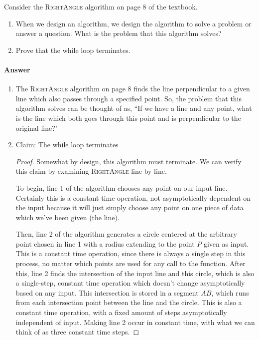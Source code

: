\documentclass{article}
\begin{document}
\nextprob
Consider the \textsc{RightAngle} algorithm on page 8 of the textbook.
\begin{enumerate}
    \item When we design an algorithm, we design the algorithm to solve a
        problem or answer a question.  What is the problem that this algorithm
        solves?
    \item Prove that the while loop terminates.
\end{enumerate}

\paragraph{Answer}


\begin{enumerate}
	\item The \textsc{RightAngle} algorithm on page 8 finds the line perpendicular to a given line which 
		also passes through a specified point. So, the problem that this algorithm
		solves can be thought of as, ``If we have a line and any point, what is the line
		which both goes through this point and is perpendicular to the original line?"
	\item Claim: The while loop terminates
		\begin{proof}
			Somewhat by design, this algorithm must terminate. We can verify this claim by
			examining \textsc{RightAngle} line by line.

			To begin, line 1 of the algorithm chooses any point on our input line. Certainly
			this is a constant time operation, not asymptotically dependent on the input
			because it will just simply choose any point on one piece of data which we've been given
			(the line).

			Then, line 2 of the algorithm generates a circle centered at the arbitrary point chosen in
			line 1 with a radius extending to the point $P$ given as input. This is a constant time operation,
			since there is always a single step in this process, no matter which points are used for any call to
			the function. After this, line 2 finds the intersection of the input line and this circle, which is
			also a single-step, constant time operation which doesn't change asymptotically based on any input.
			This intersection is stored in a segment $AB$, which runs from each intersection point between the line 
			and the circle. This is also a constant time operation, with a fixed amount of
			steps asymptotically independent of input. Making line 2 occur in constant time, with what we 
			can think of as three constant time steps.
			

\end{proof}
\end{enumerate}
\end{document}
